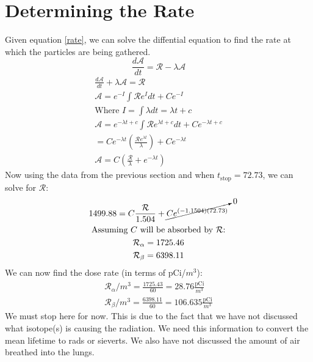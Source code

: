 \documentclass[11pt]{article}
\renewcommand{\d}[2]{\frac{d #1}{d #2}} %
\renewcommand{\=}[1]{\stackrel{#1}{=}} %
\theoremstyle{definition}
\theoremstyle{remark}
\begin{document}
\section{Determining the Rate}
Given equation \ref{rate}, we can solve the diffential equation to find the rate at which the particles are being gathered.
\begin{equation} \label{rate}
\d{\mathcal{A}}{t} = \mathcal{R} - \lambda\mathcal{A}
\end{equation}
\begin{gather}
\d{\mathcal{A}}{t} + \lambda\mathcal{A} = \mathcal{R} \\
\mathcal{A} = e^{-I}\int\mathcal{R}e^I dt + Ce^{-I} \\
\text{Where } I = \int\lambda dt = \lambda t + c \\
\mathcal{A} = e^{-\lambda t + c}\int\mathcal{R}e^{\lambda t + c}dt + Ce^{-\lambda t + c} \\
 = Ce^{-\lambda t}\left(\frac{\mathcal{R}e^{\lambda t}}{\lambda}\right) + Ce^{-\lambda t} \\
 \mathcal{A} = C\left(\frac{\mathcal{R}}{\lambda} + e^{-\lambda t}\right)
\end{gather}
Now using the data from the previous section and when $t_{\text{stop}} = 72.73$, we can solve for $\mathcal{R}$:
\begin{gather}
1499.88 = C\frac{\mathcal{R}}{1.504} + \cancelto{0}{Ce^{(-1.1504)(72.73)}} \\
\text{Assuming $C$ will be absorbed by $\mathcal{R}$:}\\
\mathcal{R}_\alpha = 1725.46 \\
\mathcal{R}_\beta =  6398.11
\end{gather}
We can now find the dose rate (in terms of pCi/$m^3$):
\begin{gather}
\mathcal{R}_\alpha/m^3 = \frac{1725.43}{60} = 28.76\frac{\text{pCi}}{m^3} \\
\mathcal{R}_\beta/m^3 = \frac{6398.11}{60} = 106.635\frac{\text{pCi}}{m^3} 
\end{gather}
We must stop here for now. This is due to the fact that we have not discussed what isotope(s) is causing the radiation. We need this information to convert the mean lifetime to rads or sieverts. We also have not discussed the amount of air breathed into the lungs.
\end{document}
